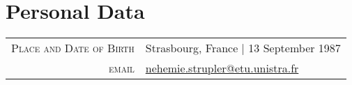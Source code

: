 \documentclass[a4paper,10pt]{article}
\begin{document}
\thispagestyle{empty}
\par{\bigskip\par} %
\vspace{-0.7cm}
\flushright {\small \textcolor{Gray}{Last update: \isodate\today} } %




\vspace{0.5cm}
\section{Personal Data}

\flushleft
\begin{tabular}{rl}
\textsc{Place and Date of Birth} & Strasbourg, France  | 13 September 1987 \\
\textsc{email} & \href{mailto:nehemie.strupler@etu.unistra.fr}{nehemie.strupler@etu.unistra.fr}
\end{tabular}




\vspace{0.3cm}



\vspace{0.cm}



\vspace{0.2cm}

\end{document}
